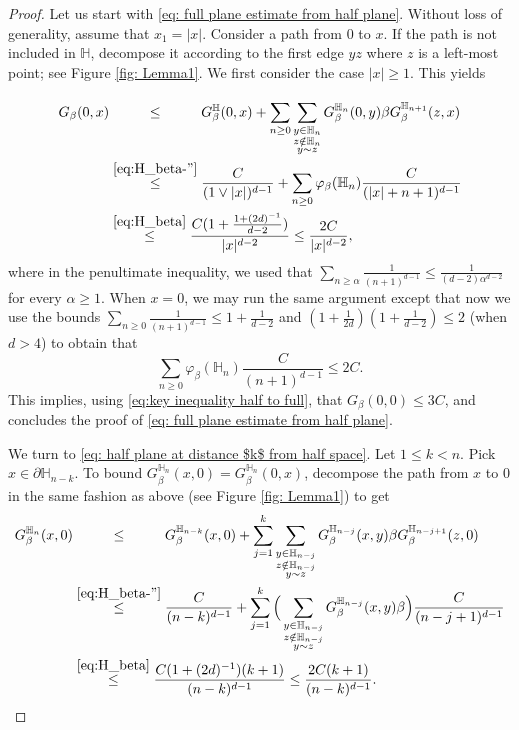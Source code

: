 \documentclass[11pt,a4paper]{article}
\numberwithin{equation}{section}
\theoremstyle{plain}
\theoremstyle{definition}
\begin{document}
\begin{proof} Let us start with \eqref{eq: full plane estimate from half plane}. Without loss of generality, assume that $x_1=|x|$. Consider a path from $0$ to $x$.
If the path is not included in $\mathbb H$, decompose it according to the first edge $yz$ where $z$ is a left-most point; see Figure \ref{fig: Lemma1}. We first consider the case $|x|\geq 1$. This yields
\begin{align}    G_\beta(0,x)&\stackrel{\phantom{\eqref{eq:H_beta-''}}}\le G^{\mathbb H}_\beta(0,x)+\sum_{n\ge 0}\sum_{\substack{y\in \mathbb H_{n}\\ z\notin \mathbb H_n\\ y\sim z}} G_\beta^{\mathbb H_{n}}(0,y)\beta  G_\beta^{\mathbb H_{n+1}}(z,x)\\
    &\stackrel{\eqref{eq:H_beta-''}}\le\frac{C}{(1\vee|x|)^{d-1}}+ \sum_{n\ge 0}\varphi_\beta(\mathbb H_n)\frac{C}{(|x|+n+1)^{d-1}}\\
    &\stackrel{\eqref{eq:H_beta}}\le \frac{C(1+\tfrac{1+(2d)^{-1}}{d-2})}{|x|^{d-2}}\le \frac{2C}{|x|^{d-2}},\label{eq:key inequality half to full}
    \end{align}
  where in the penultimate inequality, we used that $\sum_{n\geq \alpha}\tfrac{1}{(n+1)^{d-1}}\leq \tfrac{1}{(d-2)\alpha^{d-2}}$ for every $\alpha\ge1$. When $x=0$, we may run the same argument except that now we use the bounds $\sum_{n\geq 0}\tfrac{1}{(n+1)^{d-1}}\leq 1+\tfrac{1}{d-2}$ and $(1+\tfrac{1}{2d})(1+\tfrac{1}{d-2})\leq 2$ (when $d>4$) to obtain that
  \begin{equation}
  	\sum_{n\geq 0}\varphi_\beta(\mathbb H_n)\frac{C}{(n+1)^{d-1}}\leq 2C.
  \end{equation}
  This implies, using \eqref{eq:key inequality half to full}, that $G_\beta(0,0)\leq 3C$, and concludes the proof of \eqref{eq: full plane estimate from half plane}.
    
  We turn to \eqref{eq: half plane at distance $k$ from half space}. Let $1\leq k <n$. Pick $x\in \partial\mathbb H_{n-k}$. To bound $G_\beta^{\mathbb H_n}(x,0)=G_\beta^{\mathbb H_n}(0,x)$, decompose the path from $x$ to 0 in the same fashion as above (see Figure \ref{fig: Lemma1}) to get
    \begin{align}\label{eq: decomposition at distance k from hyperplane}
  	G^{\mathbb H_n}_\beta(x,0)&\stackrel{\phantom{\eqref{eq:H_beta-''}}}\leq G^{\mathbb H_{n-k}}_\beta(x,0)+\sum_{j=1}^{k}\sum_{\substack{y\in \mathbb H_{n-j}\\z\notin \mathbb H_{n-j}\\ y\sim z}}G_\beta^{\mathbb H_{n-j}}(x,y)\beta G_\beta^{\mathbb H_{n-j+1}}(z,0)
  	\\&\stackrel{\eqref{eq:H_beta-''}}\leq\frac{C}{(n-k)^{d-1}}+\sum_{j=1}^{k} \Big(\sum_{\substack{y\in \mathbb H_{n-j}\\z\notin \mathbb H_{n-j}\\ y\sim z}}G_\beta^{\mathbb H_{n-j}}(x,y)\beta\Big) \frac{C}{(n-j+1)^{d-1}}
  	\\&\stackrel{\eqref{eq:H_beta}}\leq \frac{C(1+(2d)^{-1})(k+1)}{(n-k)^{d-1}}\le \frac{2C(k+1)}{(n-k)^{d-1}}.
  \end{align}
  

\end{proof}
\end{document}
